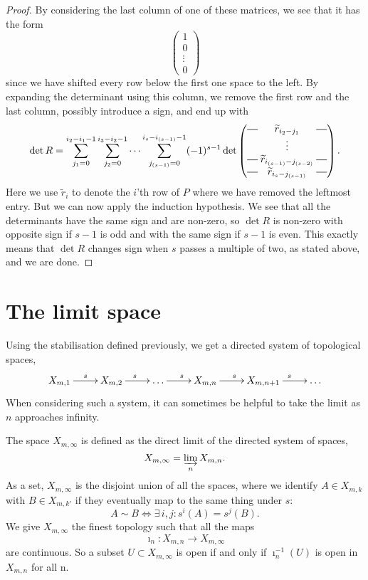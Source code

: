 \begin{proof}
  By considering the last column of one of these matrices, we see that
  it has the form
  \[
  \begin{pmatrix}
    1 \\
    0 \\
    \vdots \\
    0
  \end{pmatrix} \]
  since we have shifted every row below the first one space to the
  left. By expanding the determinant using this column, we remove the
  first row and the last column, possibly introduce a sign, and
  end up with
  \[ \det R = \sum_{j_1 = 0}^{i_2-i_1-1}\sum_{j_2 = 0}^{i_3-i_2-1}
  \dots \sum_{j_{(s-1)}=0}^{i_s-i_{(s-1)}-1} (-1)^{s-1} \det
  \begin{pmatrix}
    \matrow{\widetilde{r}_{i_2-j_1}} \\
    & \hspace{-0.75em} \vdots & \\
    \matrow{\widetilde{r}_{i_{(s-1)}-j_{(s-2)}}} \\
    \matrow{\widetilde{r}_{i_s-j_{(s-1)}}}
  \end{pmatrix}. \]
  Here we use $\widetilde{r}_i$ to denote the $i$'th row of $P$ where we
  have removed the leftmost entry. But we can now apply the induction
  hypothesis. We see that all the determinants have the same sign and
  are non-zero,
  so $\det R$ is non-zero with opposite sign if $s-1$ is odd and
  with the
  same sign if $s-1$ is even. This exactly means that $\det R$ changes
  sign
  when $s$ passes a multiple of two, as stated above, and we are done.
\end{proof}

\section{The limit space}
\label{sec:rum-gr}

Using the stabilisation defined previously, we get a directed system
of topological spaces,
\[ \xymatrix{X_{m,1} \ar[r]^s & X_{m,2} \ar[r]^s & \dots \ar[r]^s &
  X_{m,n} \ar[r]^s & X_{m,n+1} \ar[r]^s & \dots } \]
When considering such a system, it can sometimes be helpful to
take the limit as $n$ approaches infinity.

\begin{definition}
  The space $X_{m,\infty}$ is defined as the direct limit of the
  directed system of spaces,
  \[ X_{m,\infty} = \varinjlim_n X_{m,n}. \]
  As a set, $X_{m,\infty}$ is the disjoint union of all the spaces,
  where we identify $A \in X_{m,k}$ with $B \in X_{m,k'}$ if they
  eventually map to the same thing under $s$:
  \[ A \sim B \iff \exists\, i,j : s^i(A) = s^j(B). \]
  We give $X_{m,\infty}$ the finest topology such that all the
  maps 
  \[ \imath_n : X_{m,n} \to X_{m,\infty} \]
  are continuous. So a subset $U \subset X_{m,\infty}$ is open if and
  only if $\imath_n^{-1}(U)$ is open in $X_{m,n}$ for all n.
\end{definition}

